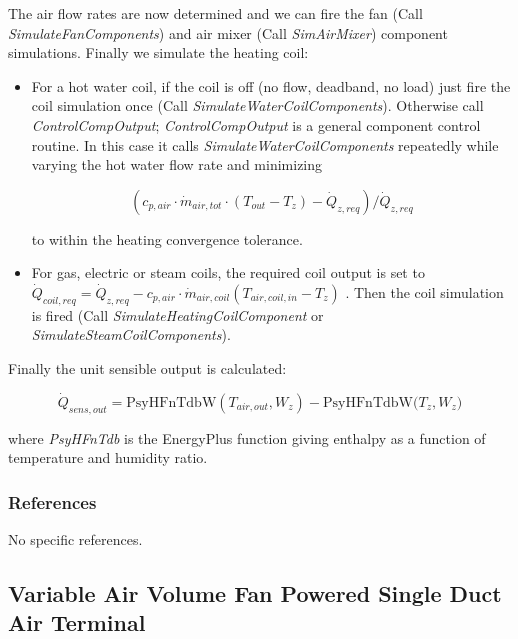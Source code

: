 The air flow rates are now determined and we can fire the fan (Call \emph{SimulateFanComponents}) and air mixer (Call \emph{SimAirMixer}) component simulations. Finally we simulate the heating coil:

\begin{itemize}
  \item
    For a hot water coil, if the coil is off (no flow, deadband, no load) just fire the coil simulation once (Call \emph{SimulateWaterCoilComponents}). Otherwise call \emph{ControlCompOutput}; \emph{ControlCompOutput} is a general component control routine. In this case it calls \emph{SimulateWaterCoilComponents} repeatedly while varying the hot water flow rate and minimizing

\begin{equation}
({c_{p,air}}\cdot {\dot m_{air,tot}}\cdot ({T_{out}} - {T_z}) - {\dot Q_{z,req}})/{\dot Q_{z,req}}
\end{equation}

to within the heating convergence tolerance.

  \item
    For gas, electric or steam coils, the required coil output is set to \({\dot Q_{coil,req}} = {\dot Q_{z,req}} - {c_{p,air}}\cdot {\dot m_{air,coil}}({T_{air,coil,in}} - {T_z})\) . Then the coil simulation is fired (Call \emph{SimulateHeatingCoilComponent} or \emph{SimulateSteamCoilComponents}).
\end{itemize}

Finally the unit sensible output is calculated:

\begin{equation}
{\dot Q_{sens,out}} = {\mathrm{PsyHFnTdbW}}({T_{air,out}},{W_z}) - {\mathrm{PsyHFnTdbW(}}{T_z},{W_z})
\end{equation}

where \emph{PsyHFnTdb} is the EnergyPlus function giving enthalpy as a function of temperature and humidity ratio.

\subsubsection{References}\label{references-2}

No specific references.

\subsection{Variable Air Volume Fan Powered Single Duct Air Terminal}\label{variable-air-volume-fan-powered-single-duct-air-terminal}

